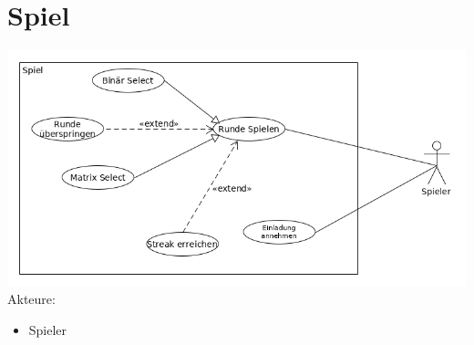 \documentclass[a4paper]{scrreprt}
\begin{document}
    \section{Spiel}
    \includegraphics[width=\textwidth]{uml/export/Spiel.png}
    Akteure: 
    \begin{itemize}
    \item \Gls{Spieler}
    \end{itemize}
\end{document}
